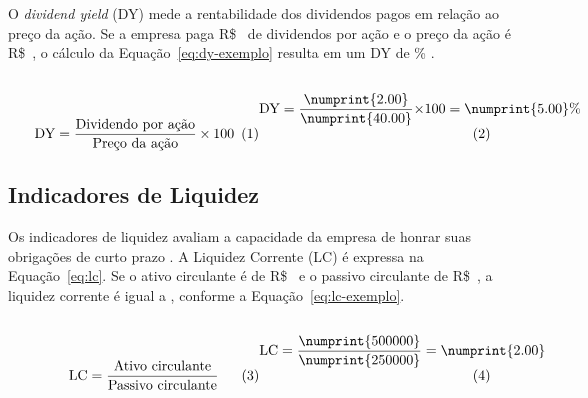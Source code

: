 O \textit{dividend yield} (DY) mede a rentabilidade dos dividendos pagos em relação ao preço da ação. Se a empresa paga R\$~ de dividendos por ação e o preço da ação é R\$~, o cálculo da Equação~\eqref{eq:dy-exemplo} resulta em um DY de \% \cite{kearney:2014:textual}.

\bigskip
\begin{subequations} \noindent
\begin{minipage}[b]{0.48\linewidth}
    \begin{equation} \label{eq:dy}
        \text{DY} = \frac{\text{Dividendo por ação}}{\text{Preço da ação}} \times 100
    \end{equation}
\end{minipage}
\hfill
\begin{minipage}[b]{0.48\linewidth}
    \begin{equation} \label{eq:dy-exemplo}
        \text{DY} = \frac{\numprint{2.00}}{\numprint{40.00}} \times 100 = \numprint{5.00}\%
    \end{equation}
\end{minipage}
\end{subequations}
\bigskip

\subsection{Indicadores de Liquidez}

Os indicadores de liquidez avaliam a capacidade da empresa de honrar suas obrigações de curto prazo \cite{claessens:2017:macroeconomic}. A Liquidez Corrente (LC) é expressa na Equação~\eqref{eq:lc}. Se o ativo circulante é de R\$~ e o passivo circulante de R\$~, a liquidez corrente é igual a , conforme a Equação~\eqref{eq:lc-exemplo}.

\bigskip
\begin{subequations} \noindent
\begin{minipage}[b]{0.48\linewidth}
    \begin{equation} \label{eq:lc}
        \text{LC} = \frac{\text{Ativo circulante}}{\text{Passivo circulante}}
    \end{equation}
\end{minipage}
\hfill
\begin{minipage}[b]{0.48\linewidth}
    \begin{equation}\label{eq:lc-exemplo}
        \text{LC} = \frac{\numprint{500000}}{\numprint{250000}} = \numprint{2.00}
    \end{equation}
\end{minipage}
\end{subequations}
\bigskip

